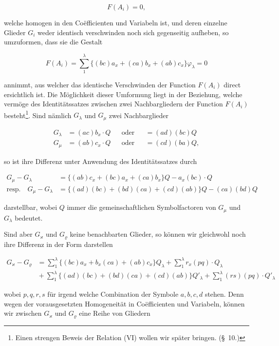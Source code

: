 \documentclass[11pt]{article}
\providecommand{\weberpage}[1]{}
\providecommand{\weq}[2]{\begin{equation}\tag{#1}#2\end{equation}}
\begin{document}
\[ F(A_i) = 0, \]

welche homogen in den Coëfficienten und Variabeln ist, und deren
einzelne Glieder $G_i$ weder identisch verschwinden noch sich gegenseitig
aufheben, so umzuformen, dass sie die Gestalt

\weq{VI}{F(A_i) = \sum_1^\lambda \{(bc)a_x + (ca)b_x + (ab)c_x\}\varphi_\lambda = 0}

annimmt, aus welcher das identische Verschwinden der Function $F(A_i)$
direct ersichtlich ist. Die Möglichkeit dieser Umformung liegt in der
Beziehung, welche vermöge des Identitätssatzes zwischen zwei Nachbargliedern
der Function $F(A_i)$ besteht\footnote{Einen strengen Beweis der Relation (VI) wollen wir später bringen. (\S~10.)}. Sind nämlich $G_\lambda$ und $G_\mu$
zwei Nachbarglieder

\[
\begin{aligned}
G_\lambda &{}= (ac)b_x\cdot Q &&\text{oder} &&{}= (ad)(bc)Q\\
G_\mu &{}= (ab)c_x\cdot Q &&\text{oder} &&{}= (cd)(ba)Q,
\end{aligned}
\]

so ist ihre Differenz unter Anwendung des Identitätssatzes durch

\weq{1}{
\begin{aligned}
G_\mu - G_\lambda &{}= \{(ab)c_x + (bc)a_x + (ca)b_x\}Q - a_x(bc)\cdot Q\\
\text{resp.}\quad G_\mu - G_\lambda &{}= \{(ad)(bc) + (bd)(ca) + (cd)(ab)\}Q - (ca)(bd)Q
\end{aligned}
}


\weberpage{15}
darstellbar, wobei $Q$ immer die gemeinschaftlichen Symbolfactoren von
$G_\mu$ und $G_\lambda$ bedeutet.

Sind aber $G_\varkappa$ und $G_\varrho$ keine benachbarten Glieder, so können wir
gleichwohl noch ihre Differenz in der Form darstellen

\weq{2}{
\begin{aligned}
G_\varkappa - G_\varrho &{}= \sum_1^\lambda \{(bc)a_x + b_x(ca) + (ab)c_x\}Q_\lambda + \sum_1^\lambda r_x(pq)\cdot Q_\lambda\\
&{}+ \sum_1^\lambda \{(ad)(bc)+(bd)(ca)+(cd)(ab)\}Q'_\lambda+\sum_1^\lambda (rs)(pq)\cdot Q'_\lambda
\end{aligned}
}

wobei $p, q, r, s$ für irgend welche Combination der Symbole $a, b, c, d$
stehen. Denn wegen der vorausgesetzten Homogeneität in Coëfficienten
und Variabeln, können wir zwischen $G_\varkappa$ und $G_\varrho$ eine Reihe von
Gliedern
\end{document}
